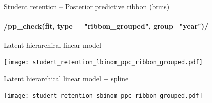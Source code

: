 \documentclass[t]{beamer}
\begin{document}
\begin{frame}[fragile]{Student retention -- Posterior predictive ribbon (brms)}
\framesubtitle{\rinline/pp_check(fit, type = "ribbon_grouped", group="year")/}

\vspace{-0.8\baselineskip}  
Latent hierarchical linear model\\  
  \hspace{-7mm}
  \begin{minipage}[t][3.6cm][t]{1.0\linewidth}
    \texttt{[image: student\_retention\_lbinom\_ppc\_ribbon\_grouped.pdf]}
  \end{minipage}
  
\vspace{-0.5\baselineskip}  
Latent hierarchical linear model + spline\\  
  \hspace{-7mm}
  \begin{minipage}[t][3.6cm][t]{1.0\linewidth}
    \texttt{[image: student\_retention\_sbinom\_ppc\_ribbon\_grouped.pdf]}
  \end{minipage}  

\end{frame}


  

\end{document}
